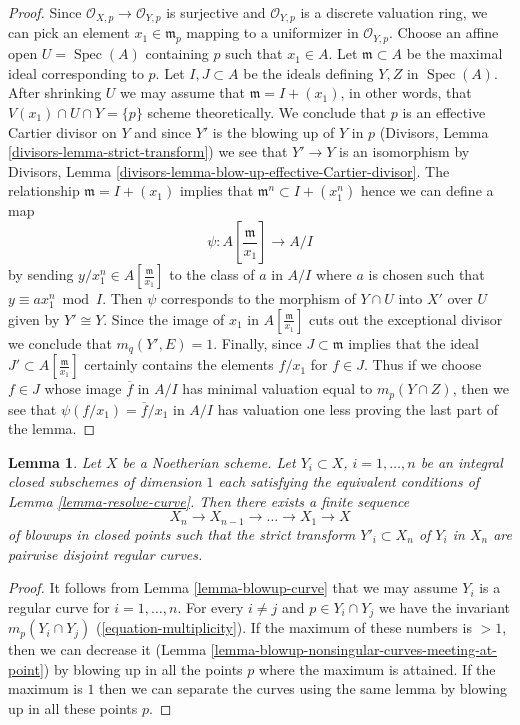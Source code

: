 \documentclass{stacks-project}
\theoremstyle{plain}
\newtheorem{lemma}[subsection]{Lemma}
\theoremstyle{definition}
\theoremstyle{remark}
\numberwithin{equation}{subsection}
\def\Spec{\mathop{\mathrm{Spec}}}
\begin{document}
\begin{proof}
Since $\mathcal{O}_{X, p} \to \mathcal{O}_{Y, p}$ is surjective and
$\mathcal{O}_{Y, p}$ is a discrete valuation ring, we can pick an
element $x_1 \in \mathfrak m_p$ mapping to a uniformizer in
$\mathcal{O}_{Y, p}$. Choose an affine open $U = \Spec(A)$ containing
$p$ such that $x_1 \in A$. Let $\mathfrak m \subset A$ be the
maximal ideal corresponding to $p$. Let $I, J \subset A$
be the ideals defining $Y, Z$ in $\Spec(A)$. After shrinking $U$
we may assume that $\mathfrak m = I + (x_1)$, in other words,
that $V(x_1) \cap U \cap Y = \{p\}$ scheme theoretically.
We conclude that $p$ is an effective Cartier divisor on $Y$ and
since $Y'$ is the blowing up of $Y$ in $p$
(Divisors, Lemma \ref{divisors-lemma-strict-transform})
we see that $Y' \to Y$ is an isomorphism by
Divisors, Lemma \ref{divisors-lemma-blow-up-effective-Cartier-divisor}.
The relationship $\mathfrak m = I + (x_1)$ implies that
$\mathfrak m^n \subset I + (x_1^n)$ hence we can define a map
$$
\psi : A[\textstyle{\frac{\mathfrak m}{x_1}}] \longrightarrow A/I
$$
by sending $y/x_1^n \in A[\frac{\mathfrak m}{x_1}]$
to the class of $a$ in $A/I$ where $a$
is chosen such that $y \equiv ax_1^n \bmod I$.
Then $\psi$ corresponds to the morphism of $Y \cap U$ into $X'$
over $U$ given by $Y' \cong Y$. Since the image of $x_1$
in $A[\frac{\mathfrak m}{x_1}]$ cuts out the exceptional divisor
we conclude that $m_q(Y', E) = 1$. Finally, since
$J \subset \mathfrak m$ implies that the ideal
$J' \subset A[\frac{\mathfrak m}{x_1}]$ certainly
contains the elements $f/x_1$ for $f \in J$.
Thus if we choose $f \in J$ whose image $\overline{f}$ in $A/I$ has
minimal valuation equal to $m_p(Y \cap Z)$, then we see that
$\psi(f/x_1) = \overline{f}/x_1$ in $A/I$ has valuation one less
proving the last part of the lemma.
\end{proof}

\begin{lemma}
\label{lemma-blowup-curves}
Let $X$ be a Noetherian scheme. Let $Y_i \subset X$, $i = 1, \ldots, n$
be an integral closed subschemes of dimension $1$ each satisfying the
equivalent conditions of Lemma \ref{lemma-resolve-curve}. Then there
exists a finite sequence
$$
X_n \to X_{n - 1} \to \ldots \to X_1 \to X
$$
of blowups in closed points such that the strict transform $Y'_i \subset X_n$
of $Y_i$ in $X_n$ are pairwise disjoint regular curves.
\end{lemma}

\begin{proof}
It follows from Lemma \ref{lemma-blowup-curve} that we may assume $Y_i$
is a regular curve for $i = 1, \ldots, n$. For every $i \not = j$
and $p \in Y_i \cap Y_j$ we have the invariant
$m_p(Y_i \cap Y_j)$ (\ref{equation-multiplicity}).
If the maximum of these numbers is $> 1$, then we can decrease
it (Lemma \ref{lemma-blowup-nonsingular-curves-meeting-at-point})
by blowing up in all the points $p$ where the maximum is attained.
If the maximum is $1$ then we can separate the curves using the
same lemma by blowing up in all these points $p$.
\end{proof}
\end{document}
